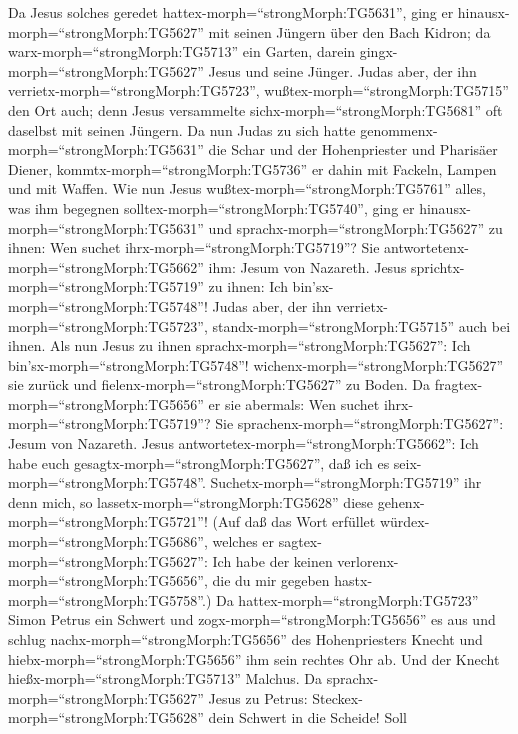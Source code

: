  Da Jesus solches geredet
hattex-morph=``strongMorph:TG5631'', ging er
hinausx-morph=``strongMorph:TG5627'' mit seinen Jüngern über den Bach
Kidron; da warx-morph=``strongMorph:TG5713'' ein Garten, darein
gingx-morph=``strongMorph:TG5627'' Jesus und seine Jünger. 
Judas aber, der ihn verrietx-morph=``strongMorph:TG5723'',
wußtex-morph=``strongMorph:TG5715'' den Ort auch; denn Jesus versammelte
sichx-morph=``strongMorph:TG5681'' oft daselbst mit seinen Jüngern.
 Da nun Judas zu sich hatte
genommenx-morph=``strongMorph:TG5631'' die Schar und der Hohenpriester
und Pharisäer Diener, kommtx-morph=``strongMorph:TG5736'' er dahin mit
Fackeln, Lampen und mit Waffen.  Wie nun Jesus
wußtex-morph=``strongMorph:TG5761'' alles, was ihm begegnen
solltex-morph=``strongMorph:TG5740'', ging er
hinausx-morph=``strongMorph:TG5631'' und
sprachx-morph=``strongMorph:TG5627'' zu ihnen: Wen suchet
ihrx-morph=``strongMorph:TG5719''?  Sie
antwortetenx-morph=``strongMorph:TG5662'' ihm: Jesum von Nazareth. Jesus
sprichtx-morph=``strongMorph:TG5719'' zu ihnen: Ich
bin'sx-morph=``strongMorph:TG5748''! Judas aber, der ihn
verrietx-morph=``strongMorph:TG5723'',
standx-morph=``strongMorph:TG5715'' auch bei ihnen.  Als nun
Jesus zu ihnen sprachx-morph=``strongMorph:TG5627'': Ich
bin'sx-morph=``strongMorph:TG5748''!
wichenx-morph=``strongMorph:TG5627'' sie zurück und
fielenx-morph=``strongMorph:TG5627'' zu Boden.  Da
fragtex-morph=``strongMorph:TG5656'' er sie abermals: Wen suchet
ihrx-morph=``strongMorph:TG5719''? Sie
sprachenx-morph=``strongMorph:TG5627'': Jesum von Nazareth. 
Jesus antwortetex-morph=``strongMorph:TG5662'': Ich habe euch
gesagtx-morph=``strongMorph:TG5627'', daß ich es
seix-morph=``strongMorph:TG5748''. Suchetx-morph=``strongMorph:TG5719''
ihr denn mich, so lassetx-morph=``strongMorph:TG5628'' diese
gehenx-morph=``strongMorph:TG5721''!  (Auf daß das Wort
erfüllet würdex-morph=``strongMorph:TG5686'', welches er
sagtex-morph=``strongMorph:TG5627'': Ich habe der keinen
verlorenx-morph=``strongMorph:TG5656'', die du mir gegeben
hastx-morph=``strongMorph:TG5758''.)  Da
hattex-morph=``strongMorph:TG5723'' Simon Petrus ein Schwert und
zogx-morph=``strongMorph:TG5656'' es aus und schlug
nachx-morph=``strongMorph:TG5656'' des Hohenpriesters Knecht und
hiebx-morph=``strongMorph:TG5656'' ihm sein rechtes Ohr ab. Und der
Knecht hießx-morph=``strongMorph:TG5713'' Malchus.  Da
sprachx-morph=``strongMorph:TG5627'' Jesus zu Petrus:
Steckex-morph=``strongMorph:TG5628'' dein Schwert in die Scheide! Soll
